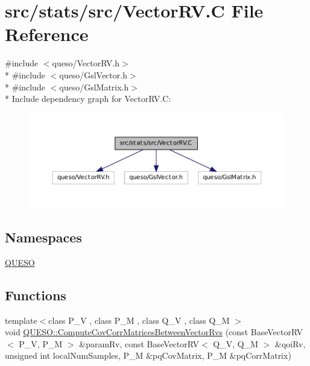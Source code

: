 \hypertarget{_vector_r_v_8_c}{\section{src/stats/src/\-Vector\-R\-V.C File Reference}
\label{_vector_r_v_8_c}
}
{\ttfamily \#include $<$queso/\-Vector\-R\-V.\-h$>$}\\*
{\ttfamily \#include $<$queso/\-Gsl\-Vector.\-h$>$}\\*
{\ttfamily \#include $<$queso/\-Gsl\-Matrix.\-h$>$}\\*
Include dependency graph for Vector\-R\-V.\-C\-:
\nopagebreak
\begin{figure}[H]
\begin{center}
\leavevmode
\includegraphics[width=350pt]{_vector_r_v_8_c__incl}
\end{center}
\end{figure}
\subsection*{Namespaces}
\begin{DoxyCompactItemize}
\item 
\hyperlink{namespace_q_u_e_s_o}{Q\-U\-E\-S\-O}
\end{DoxyCompactItemize}
\subsection*{Functions}
\begin{DoxyCompactItemize}
\item 
{\footnotesize template$<$class P\-\_\-\-V , class P\-\_\-\-M , class Q\-\_\-\-V , class Q\-\_\-\-M $>$ }\\void \hyperlink{namespace_q_u_e_s_o_a4b9472b3a017ccaffbea8cc69b96afac}{Q\-U\-E\-S\-O\-::\-Compute\-Cov\-Corr\-Matrices\-Between\-Vector\-Rvs} (const Base\-Vector\-R\-V$<$ P\-\_\-\-V, P\-\_\-\-M $>$ \&param\-Rv, const Base\-Vector\-R\-V$<$ Q\-\_\-\-V, Q\-\_\-\-M $>$ \&qoi\-Rv, unsigned int local\-Num\-Samples, P\-\_\-\-M \&pq\-Cov\-Matrix, P\-\_\-\-M \&pq\-Corr\-Matrix)
\end{DoxyCompactItemize}
